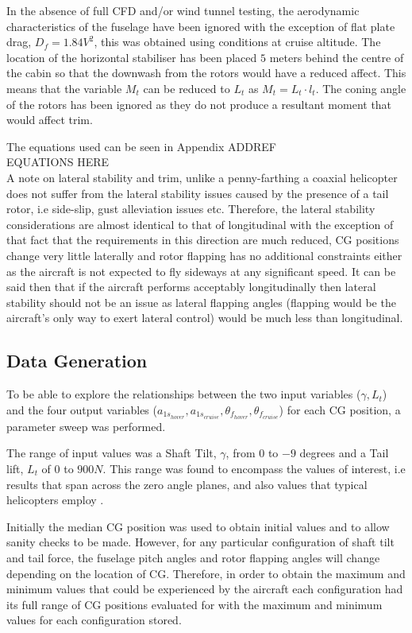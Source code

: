 \documentclass[11pt,a4paper]{article}
\begin{document}
In the absence of full CFD and/or wind tunnel testing, the aerodynamic characteristics of the fuselage have been ignored with the exception of flat plate drag, $D_f=1.84V^2$, this was obtained using conditions at cruise altitude.
The location of the horizontal stabiliser has been placed $5$ meters behind the centre of the cabin so that the downwash from the rotors would have a reduced affect. This means that the variable $M_t$ can be reduced to $L_t$ as $M_t=L_t\cdot l_t$. The coning angle of the rotors has been ignored as they do not produce a resultant moment that would affect trim.

The equations used can be seen in Appendix ADDREF\\

EQUATIONS HERE\\

A note on lateral stability and trim, unlike a penny-farthing a coaxial helicopter does not suffer from the lateral stability issues caused by the presence of a tail rotor, i.e side-slip, gust alleviation issues etc. Therefore, the lateral stability considerations are almost identical to that of longitudinal with the exception of that fact that the requirements in this direction are much reduced, CG positions change very little laterally and rotor flapping has no additional constraints either as the aircraft is not expected to fly sideways at any significant speed.
It can be said then that if the aircraft performs acceptably longitudinally then lateral stability should not be an issue as lateral flapping angles (flapping would be the aircraft's only way to exert lateral control) would be much less than longitudinal.

\subsection{Data Generation}
To be able to explore the relationships between the two input variables ($\gamma,L_t$) and the  four output variables ($a_{1s_{hover}},a_{1s_{cruise}},\theta_{f_{hover}},\theta_{f_{cruise}}$) for each CG position, a parameter sweep was performed.

The range of input values was a Shaft Tilt, $\gamma$, from $0$ to $-9$ degrees and a Tail lift, $L_t$ of $0$ to $900N$. This range was found to encompass the values of interest, i.e results that span across the zero angle planes, and also values that typical helicopters employ \cite{prouty}.

Initially the median CG position was used to obtain initial values and to allow sanity checks to be made. However, for any particular configuration of shaft tilt and tail force, the fuselage pitch angles and rotor flapping angles will change depending on the location of CG. Therefore, in order to obtain the maximum and minimum values that could be experienced by the aircraft each configuration had its full range of CG positions evaluated for with the maximum and minimum values for each configuration stored.
\end{document}
